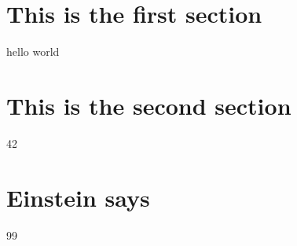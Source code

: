 \section{This is the first section}

hello world

\section{This is the second section}

42


\section{Einstein says}

99

